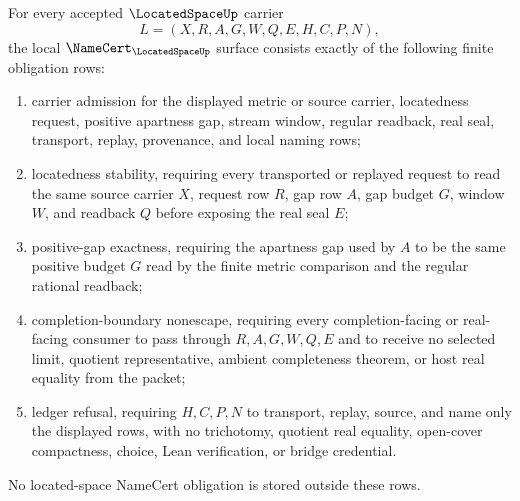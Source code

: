 \begin{theorem}
\label{thm:located-space-namecert-obligations}
For every accepted $\LocatedSpaceUp$ carrier
$$
L=(X,R,A,G,W,Q,E,H,C,P,N),
$$
the local $\NameCert_{\LocatedSpaceUp}$ surface consists exactly of the following finite obligation rows:
\begin{enumerate}
\item carrier admission for the displayed metric or source carrier, locatedness request, positive apartness gap, stream window, regular readback, real seal, transport, replay, provenance, and local naming rows;
\item locatedness stability, requiring every transported or replayed request to read the same source carrier $X$, request row $R$, gap row $A$, gap budget $G$, window $W$, and readback $Q$ before exposing the real seal $E$;
\item positive-gap exactness, requiring the apartness gap used by $A$ to be the same positive budget $G$ read by the finite metric comparison and the regular rational readback;
\item completion-boundary nonescape, requiring every completion-facing or real-facing consumer to pass through $R,A,G,W,Q,E$ and to receive no selected limit, quotient representative, ambient completeness theorem, or host real equality from the packet;
\item ledger refusal, requiring $H,C,P,N$ to transport, replay, source, and name only the displayed rows, with no trichotomy, quotient real equality, open-cover compactness, choice, Lean verification, or bridge credential.
\end{enumerate}
No located-space NameCert obligation is stored outside these rows.
\end{theorem}
